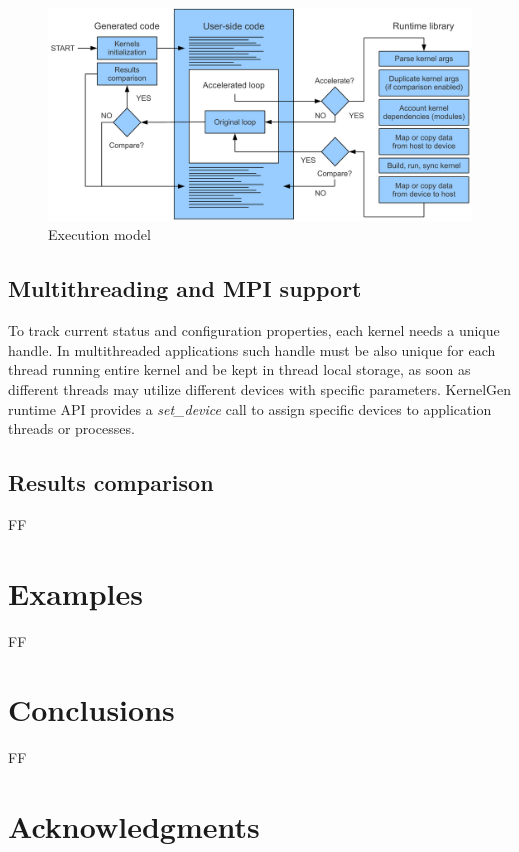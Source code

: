 \documentclass[a4,12pt]{article}
\begin{document}
\begin{figure}
\centering
\includegraphics[scale=0.4]{figures/execution.pdf}
\caption{Execution model}
\label{fig:execution}
\end{figure}

\subsection{Multithreading and MPI support}

To track current status and configuration properties, each kernel needs a unique handle. In multithreaded applications such handle must be also unique for each thread running entire kernel and be kept in thread local storage, as soon as different threads may utilize different devices with specific parameters. KernelGen runtime API provides a \emph{set\_device} call to assign specific devices to application threads or processes.

\subsection{Results comparison}

FF

\section{Examples}

FF

\section{Conclusions}

FF

\section{Acknowledgments}
\end{document}
